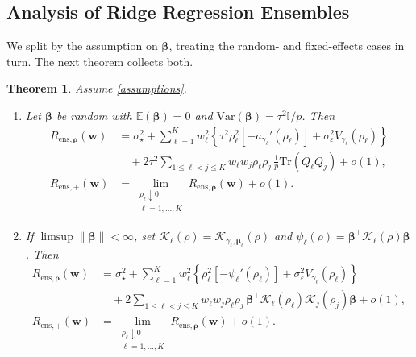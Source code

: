 \documentclass{article}
\theoremstyle{plain}
\newtheorem{theorem}{Theorem}[section]
\theoremstyle{remark}
\def \bbeta{\boldsymbol{\beta}}
\def \bbeta{\boldsymbol{\beta}}
\def \tr {\mathrm{Tr}}
\def \I{\mathcal{I}}
\def \E{\mathbb{E}}
\def \bmu{\pmb{\mu}}
\def \I {\mathbb{I}}
\begin{document}
\subsection{Analysis of Ridge Regression Ensembles}\label{sec:ensemble}
We split by the assumption on $\boldsymbol{\beta}$, treating the random- and fixed-effects cases in turn. The next theorem collects both.

\begin{theorem}\label{thm:gen_ensemble}
Assume \ref{assumptions}.
\begin{enumerate}
\item\label{thm:gen_ensemble_re} Let $\bbeta$ be random with $\E(\bbeta)=0$ and $\mathrm{Var}(\bbeta)=\tau^2\I/p$. Then
\[
\begin{aligned}
R_{\mathrm{ens},\boldsymbol{\rho}}(\mathbf{w})
&=\sigma_\star^2
+\sum_{\ell=1}^K w_\ell^2
\left\{\tau^2\rho_\ell^2[-a_{\gamma_\ell}'(\rho_\ell)]
       +\sigma_\varepsilon^2 V_{\gamma_\ell}(\rho_\ell)\right\}\\
&\quad+2\tau^2\sum_{1\le\ell<j\le K}
       w_\ell w_j\rho_\ell\rho_j\,
       \tfrac{1}{p}\tr(Q_\ell Q_j)
+o(1),\\
R_{\mathrm{ens},+}(\mathbf{w})
&=\lim_{\substack{\rho_\ell\downarrow 0\\ \ell=1,\ldots,K}}
   R_{\mathrm{ens},\boldsymbol{\rho}}(\mathbf{w})+o(1).
\end{aligned}
\]

\item\label{thm:gen_ensemble_fe} If $\limsup\|\bbeta\|<\infty$, set $\mathcal K_\ell(\rho)=\mathcal K_{\gamma_\ell,\bmu_\ell}(\rho)$ and $\psi_\ell(\rho)=\bbeta^\top\mathcal K_\ell(\rho)\bbeta$. Then
\[
\begin{aligned}
R_{\mathrm{ens},\boldsymbol{\rho}}(\mathbf{w})
&=\sigma_\star^2
+\sum_{\ell=1}^K w_\ell^2
\left\{\rho_\ell^2[-\psi_\ell'(\rho_\ell)]
       +\sigma_\varepsilon^2 V_{\gamma_\ell}(\rho_\ell)\right\}\\
&\quad+2\sum_{1\le\ell<j\le K}
       w_\ell w_j\rho_\ell\rho_j\,
       \bbeta^\top\mathcal K_\ell(\rho_\ell)\mathcal K_j(\rho_j)\bbeta
+o(1),\\
R_{\mathrm{ens},+}(\mathbf{w})
&=\lim_{\substack{\rho_\ell\downarrow 0\\ \ell=1,\ldots,K}}
   R_{\mathrm{ens},\boldsymbol{\rho}}(\mathbf{w})+o(1).
\end{aligned}
\]
\end{enumerate}
\end{theorem}
\end{document}
